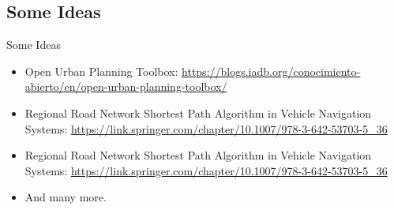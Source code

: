 \documentclass[10pt]{beamer}
\begin{document}
  \subsection{Some Ideas}

    \begin{frame}[fragile]{Some Ideas}
      \begin{itemize}
        \item Open Urban Planning Toolbox:
          \url{https://blogs.iadb.org/conocimiento-abierto/en/open-urban-planning-toolbox/}
        \item Regional Road Network Shortest Path Algorithm in Vehicle Navigation Systems: \url{https://link.springer.com/chapter/10.1007/978-3-642-53703-5\_36}
        \item Regional Road Network Shortest Path Algorithm in Vehicle Navigation Systems:
          \url{https://link.springer.com/chapter/10.1007/978-3-642-53703-5\_36}
        \item And many more.
      \end{itemize}
    \end{frame}
\end{document}
